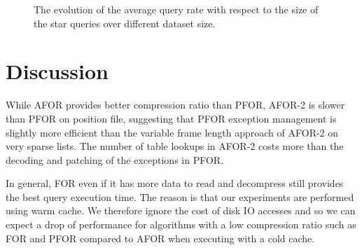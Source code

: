 \begin{figure}
  \centering
  \quad%
	\caption{The evolution of the average query rate with respect to the size of the star queries over different dataset size.}
	\label{fig:query-rate}
\end{figure}

\section{Discussion}

While AFOR provides better compression ratio than PFOR, AFOR-2 is slower than
PFOR on position file, suggesting that PFOR exception management is slightly
more efficient than the variable frame length approach of AFOR-2 on very
sparse lists. The number of table lookups in AFOR-2 costs more than the
decoding and patching of the exceptions in PFOR.

In general, FOR even if it has more data to read and decompress still provides
the best query execution time. The reason is that our experiments are
performed using warm cache. We therefore ignore the cost of disk IO
accesses and so we can expect a drop of performance for algorithms with a low
compression ratio such as FOR and PFOR compared to AFOR when executing with a
cold cache.

% 

